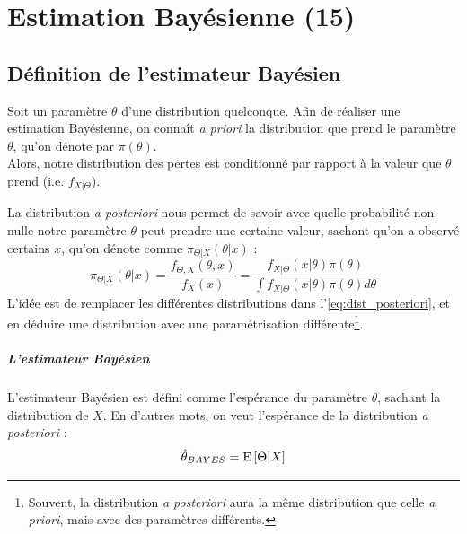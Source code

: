 \documentclass[12pt, french]{report}
\begin{document}
\chapter{Estimation Bayésienne (15)}
\section{Définition de l'estimateur Bayésien}
\begin{definition}
Soit un paramètre $\theta$ d'une distribution quelconque. Afin de réaliser une estimation Bayésienne, on connaît \emph{a priori} la distribution que prend le paramètre $\theta$, qu'on dénote par $\pi(\theta)$. \\

Alors, notre distribution des pertes est conditionné par rapport à la valeur que $\theta$ prend (i.e. $f_{X|\Theta}$).
\end{definition}

\begin{definition}
La distribution \emph{a posteriori} nous permet de savoir avec quelle probabilité non-nulle notre paramètre $\theta$ peut prendre une certaine valeur, sachant qu'on a observé certains $x$, qu'on dénote comme $\pi_{\Theta | X}(\theta | x)$ : 
\begin{equation}
\label{eq:dist_posteriori}
\pi_{\Theta | X}(\theta | x) = \frac{f_{\Theta, X}(\theta, x)}{f_{X}(x)} = \frac{f_{X|\Theta}(x | \theta) \pi(\theta)}{\int f_{X|\Theta}(x | \theta) \pi(\theta) d \theta} 
\end{equation}
L'idée est de remplacer les différentes distributions dans l'\autoref{eq:dist_posteriori}, et en déduire une distribution avec une paramétrisation différente\footnote{Souvent, la distribution \emph{a posteriori} aura la même distribution que celle \emph{a priori}, mais avec des paramètres différents.}.
\end{definition}

\paragraph{L'estimateur Bayésien} L'estimateur Bayésien est défini comme l'espérance du paramètre $\theta$, sachant la distribution de $X$. En d'autres mots, on veut l'espérance de la distribution \emph{a posteriori} : 
\begin{equation}
\label{eq:estimateur_bayes}
\hat{\theta}_{BAYES} = \mathrm{E} \left[ \Theta | X \right]
\end{equation}
\end{document}

